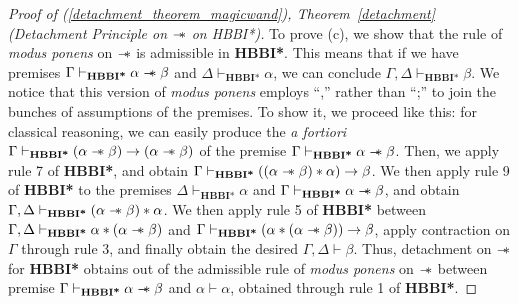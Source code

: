 \documentclass[a4paper]{article}
\newcommand\magicwand{\mathrel{-\mkern-6mu*}}
\begin{document}
\begin{proof}[Proof of (\ref{detachment_theorem_magicwand}), Theorem~\ref{detachment} (Detachment Principle on $\magicwand$ on HBBI*)]

To prove (c), we show that the rule of \textit{modus ponens} on $\magicwand$ is admissible in \textbf{HBBI*}. This means that if we have premises $\Gamma\vdash_{\textbf{HBBI*}} \alpha \magicwand \beta$ and $\Delta \vdash_{\textbf{HBBI*}} \alpha$, we can conclude $\Gamma, \Delta\vdash_{\textbf{HBBI*}} \beta$. We notice that this version of \textit{modus ponens} employs ``,'' rather than ``;'' to join the bunches of assumptions of the premises. To show it, we proceed like this: for classical reasoning, we can easily produce the \textit{a fortiori} $\Gamma\vdash_{\textbf{HBBI*}} (\alpha \magicwand \beta) \rightarrow (\alpha \magicwand \beta)$ of the premise $\Gamma\vdash_{\textbf{HBBI*}} \alpha \magicwand \beta$. Then, we apply rule 7 of \textbf{HBBI*}, and obtain $\Gamma\vdash_{\textbf{HBBI*}} ((\alpha \magicwand \beta)* \alpha) \rightarrow \beta $. We then apply rule 9 of \textbf{HBBI*} to the premises $\Delta\vdash_{\textbf{HBBI*}} \alpha$ and $\Gamma\vdash_{\textbf{HBBI*}} \alpha \magicwand \beta$, and obtain $\Gamma, \Delta \vdash_{\textbf{HBBI*}} (\alpha \magicwand \beta)* \alpha$. We then apply rule 5 of \textbf{HBBI*} between  $\Gamma, \Delta \vdash_{\textbf{HBBI*}} \alpha* (\alpha \magicwand \beta)$ and $\Gamma\vdash_{\textbf{HBBI*}} (\alpha *(\alpha \magicwand \beta)) \rightarrow \beta$, apply contraction on $\Gamma$ through rule 3, and finally obtain the desired $\Gamma, \Delta \vdash \beta.$ Thus, detachment on $\magicwand$ for \textbf{HBBI*} obtains out of the admissible rule of \textit{modus ponens} on $\magicwand$ between premise $\Gamma \vdash_{\textbf{HBBI*}}\alpha \magicwand \beta$ and $\alpha \vdash \alpha$, obtained through rule 1 of \textbf{HBBI*}.
   
\end{proof}
\end{document}
